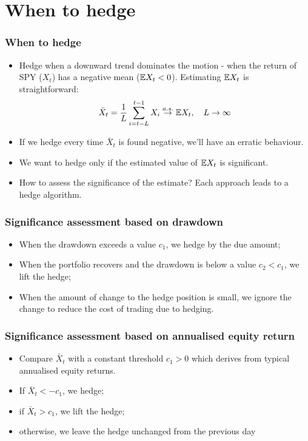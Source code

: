 \documentclass{beamer}
\begin{document}
\section{When to hedge}
\begin{frame}
  \frametitle{When to hedge}
  \begin{itemize}
  \item Hedge when a downward trend dominates the motion - when the
    return of SPY ($X_t$) has a negative mean ($\mathbb{E} X_t < 0$). Estimating
    $\mathbb{E} X_t$ is straightforward:
    \[
      \bar X_t = {1 \over L} \sum_{i=t-L}^{t-1} X_i \overset{a.s.}{\to} \mathbb{E} X_t,
      \quad
      L \to \infty
    \]
  \item If we hedge every time $\bar X_t$ is found negative, we'll have
    an erratic behaviour.
  \item We want to hedge only if the estimated value of $\mathbb{E} X_t$ is
    significant.
  \item How to assess the significance of the estimate? Each approach
    leads to a hedge algorithm.
  \end{itemize}
\end{frame}

\begin{frame}
  \frametitle{Significance assessment based on drawdown}
  \begin{itemize}
  \item When the drawdown exceeds a value $c_1$, we hedge by the due
    amount;
  \item When the portfolio recovers and the drawdown is below a value
    $c_2 < c_1$, we lift the hedge;
  \item When the amount of change to the hedge position is small,
    we ignore the change to reduce the cost of trading due to
    hedging.
  \end{itemize}
\end{frame}

\begin{frame}
  \frametitle{Significance assessment based on annualised equity return}
  \begin{itemize}
  \item Compare $\bar X_t$ with a constant threshold $c_1 > 0$ which
    derives from typical annualised equity returns.
  \item If $\bar X_t < -c_1$, we hedge;
  \item if $\bar X_t > c_1$, we lift the hedge;
  \item otherwise, we leave the hedge unchanged from the previous day
  \end{itemize}
\end{frame}
\end{document}
